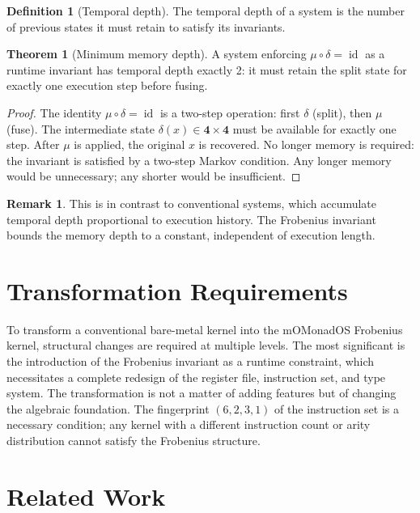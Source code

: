 \documentclass[11pt,a4paper]{article}
\theoremstyle{definition}
\newtheorem{definition}{Definition}[section]
\newtheorem{theorem}{Theorem}[section]
\newtheorem{remark}{Remark}[section]
\newcommand{\id}{\operatorname{id}}
\begin{document}
\begin{definition}[Temporal depth]
The temporal depth of a system is the number of previous states it must retain to satisfy its invariants.
\end{definition}

\begin{theorem}[Minimum memory depth]
A system enforcing $\mu \circ \delta = \id$ as a runtime invariant has temporal depth exactly 2: it must retain the split state for exactly one execution step before fusing.
\end{theorem}

\begin{proof}
The identity $\mu \circ \delta = \id$ is a two-step operation: first $\delta$ (split), then $\mu$ (fuse). The intermediate state $\delta(x) \in \mathbf{4} \times \mathbf{4}$ must be available for exactly one step. After $\mu$ is applied, the original $x$ is recovered. No longer memory is required: the invariant is satisfied by a two-step Markov condition. Any longer memory would be unnecessary; any shorter would be insufficient.
\end{proof}

\begin{remark}
This is in contrast to conventional systems, which accumulate temporal depth proportional to execution history. The Frobenius invariant bounds the memory depth to a constant, independent of execution length.
\end{remark}

\section{Transformation Requirements}

To transform a conventional bare-metal kernel into the mOMonadOS Frobenius kernel, structural changes are required at multiple levels. The most significant is the introduction of the Frobenius invariant as a runtime constraint, which necessitates a complete redesign of the register file, instruction set, and type system. The transformation is not a matter of adding features but of changing the algebraic foundation. The fingerprint $(6,2,3,1)$ of the instruction set is a necessary condition; any kernel with a different instruction count or arity distribution cannot satisfy the Frobenius structure.

\section{Related Work}
\end{document}
